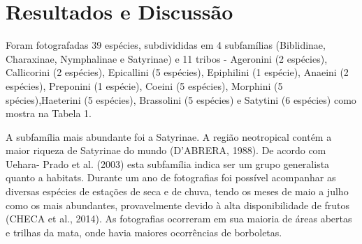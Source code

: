 \documentclass[article,12pt,onesidea,4paper,english,brazil]{abntex2}
\begin{document}
	\section*{Resultados e Discussão}
	
	Foram fotografadas 39 espécies, subdivididas em 4 subfamílias (Biblidinae, Charaxinae, Nymphalinae e Satyrinae) e 11 tribos - Ageronini (2 espécies), Callicorini (2 espécies), Epicallini (5 espécies), Epiphilini (1 espécie), Anaeini (2 espécies), Preponini (1 espécie), Coeini (5 espécies), Morphini (5 spécies),Haeterini (5 espécies), Brassolini (5 espécies) e Satytini (6 espécies) como mostra na Tabela 1.
	
	A subfamília mais abundante foi a Satyrinae. A região neotropical contém a maior riqueza de Satyrinae do mundo (D’ABRERA, 1988). De acordo com Uehara- Prado et al. (2003) esta subfamília indica ser um grupo generalista quanto a habitats. Durante um ano de fotografias foi possível acompanhar as diversas espécies de estações de seca e de chuva, tendo os meses de maio a julho como os mais abundantes, provavelmente devido à alta disponibilidade de frutos (CHECA et al., 2014). As fotografias ocorreram em sua maioria de áreas abertas e trilhas da mata, onde havia maiores ocorrências de borboletas.
	
\end{document}
